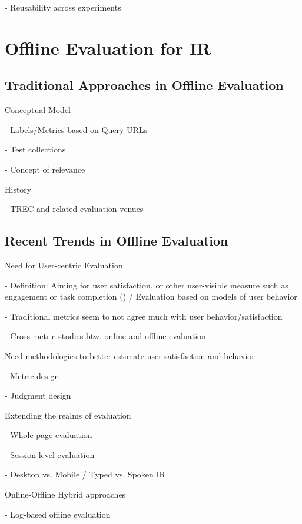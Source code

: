 \documentclass[openany]{now} %
\newcommand{\newpar}{\bigskip\noindent}
\begin{document}
- Reusability across experiments

\section{Offline Evaluation for IR}
\subsection{Traditional Approaches in Offline Evaluation}

Conceptual Model

- Labels/Metrics based on Query-URLs

- Test collections 

- Concept of relevance 

History

- TREC and related evaluation venues \cite{INR-009}

\cite{borlund2003} \cite{cleverdon67} \cite{voor:trec05}

\subsection{Recent Trends in Offline Evaluation}

Need for User-centric Evaluation

- Definition: Aiming for user satisfaction, or other user-visible measure such as engagement or task completion (\cite{scholer13}) / Evaluation based on models of user behavior

- Traditional metrics seem to not agree much with user behavior/satisfaction
 \cite{Al-Maskari2007} 

- Cross-metric studies btw. online and offline evaluation \cite{radl:comp10}

\newpar
Need methodologies to better estimate user satisfaction and behavior

-	Metric design \cite{YilmazSCR10, CarteretteKY11, ChapelleMZG09}

-	Judgment design \cite{VermaY16, VermaYC16}

\newpar
Extending the realms of evaluation

-	Whole-page evaluation \cite{Zhou:2012}

-	Session-level evaluation \cite{KanoulasCCS11, CarteretteKHC14}

-	Desktop vs. Mobile / Typed vs. Spoken IR \cite{VermaYC16}

\newpar
Online-Offline Hybrid approaches

- Log-based offline evaluation \cite{Li:2015} \cite{li2010contextual}
\end{document}
